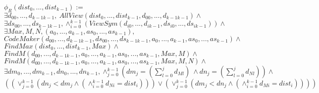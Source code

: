 \documentclass{article}
\begin{document}
\begin{center}
$\phi_R(dist_{0}, ...,dist_{k-1}):=$\\
$\exists d_{00}, ...,d_{k-1k-1},\ AllView(dist_{0}, ...,dist_{k-1}, d_{00}, ...,d_{k-1k-1})\land$\\
$\exists ds_{00}, ...,ds_{k-1k-1}, \land_{i=0}^{k-1} (ViewSym(d_{i0}, ..., d_{ik-1}, ds_{i0}, ..., ds_{ik-1}))\land$\\
$\exists Max, M, N, (a_{0}, ..., a_{k-1}, as_{0}, ..., as_{k-1}),$\\
$CodeMaker(d_{00}, ...,d_{k-1k-1}, ds_{00}, ...,ds_{k-1k-1}, a_{0}, ..., a_{k-1}, as_{0}, ..., as_{k-1})\land$\\
$FindMax(dist_{0}, ...,dist_{k-1}, Max) \land$\\
$FindM(d_{00}, ...,d_{k-1k-1}, a_{0}, ..., a_{k-1}, as_{0}, ..., as_{k-1}, Max, M) \land $\\
$FindM(d_{00}, ...,d_{k-1k-1}, a_{0}, ..., a_{k-1}, as_{0}, ..., as_{k-1}, Max, M, N) \land $\\
$\exists dm_{0}, ..., dm_{k-1}, dn_{0}, ..., dn_{k-1}, \land_{j=0}^{k-1}(dm_{j} = (\sum_{l=0}^j d_{Ml})\ 
\land dn_{j} = (\sum_{l=0}^j d_{Nl}) ) \land $\\
$((\lor_{j=0}^{k-1} (dn_{j} < dm_{j} \land (\land_{i=0}^{k-1} d_{Ni} = dist_{i}) ) ) \lor 
(\lor_{j=0}^{k-1} (dm_{j} < dn_{j} \land (\land_{i=0}^{k-1} d_{Mi} = dist_{i}) ) ) )$
\end{center}
\end{document}
